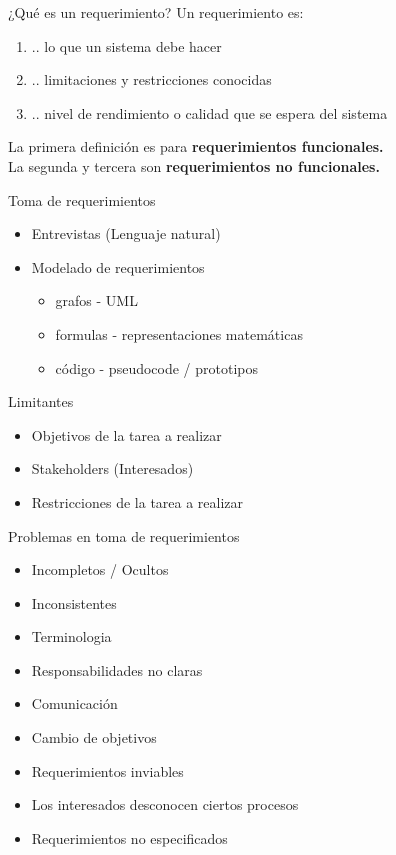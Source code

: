 \documentclass[
  24pt, %
  aspectratio=169, %
]{beamer}
\begin{document}
\begin{frame}{¿Qué es un requerimiento?}
  Un requerimiento es:
  \begin{enumerate}
  \item .. lo que un sistema debe hacer
  \item .. limitaciones y restricciones conocidas
  \item .. nivel de rendimiento o calidad que se espera del sistema
  \end{enumerate}
  \vspace{0.5cm}
  \pause
  
  La primera definición es para \textbf{requerimientos funcionales.}\\
  La segunda y tercera son \textbf{requerimientos no funcionales.}
  
\end{frame}

\begin{frame}{Toma de requerimientos}
  \begin{itemize}
  \item Entrevistas (Lenguaje natural)
  \item Modelado de requerimientos
    \begin{itemize}
    \item grafos - UML
    \item formulas - representaciones matemáticas
    \item código - pseudocode / prototipos
    \end{itemize}
  \end{itemize}
  \vspace{0.5cm}
  \pause
  Limitantes
  \begin{itemize}
  \item Objetivos de la tarea a realizar
  \item Stakeholders (Interesados)
  \item Restricciones de la tarea a realizar
  \end{itemize}
\end{frame}

\begin{frame}{Problemas en toma de requerimientos}
  \begin{itemize}
  \item Incompletos / Ocultos 
  \item Inconsistentes
  \item Terminologia
  \item Responsabilidades no claras
  \item Comunicación
  \item Cambio de objetivos
  \item Requerimientos inviables
  \item Los interesados desconocen ciertos procesos
  \item Requerimientos no especificados
  \end{itemize}
\end{frame}
\end{document}
